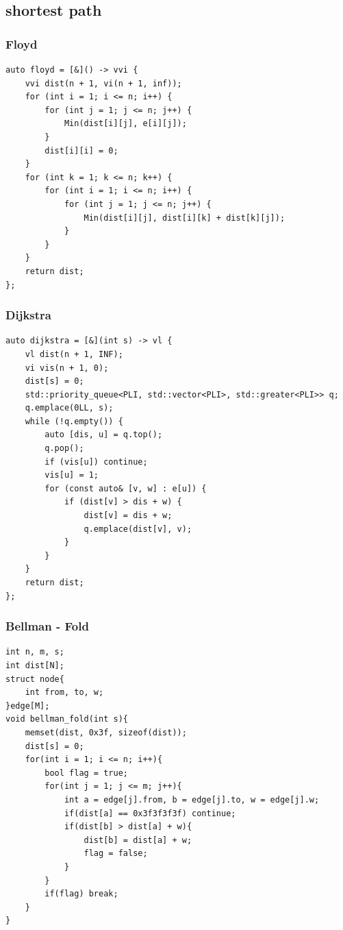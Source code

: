 \documentclass[UTF8, a4paper, titlepage, twoside]{ctexart}
\begin{document}
\subsection{ shortest path }

\subsubsection*{ Floyd }
\begin{lstlisting}[style=cpp]
auto floyd = [&]() -> vvi {
    vvi dist(n + 1, vi(n + 1, inf));
    for (int i = 1; i <= n; i++) {
        for (int j = 1; j <= n; j++) {
            Min(dist[i][j], e[i][j]);
        }
        dist[i][i] = 0;
    }
    for (int k = 1; k <= n; k++) {
        for (int i = 1; i <= n; i++) {
            for (int j = 1; j <= n; j++) {
                Min(dist[i][j], dist[i][k] + dist[k][j]);
            }
        }
    }
    return dist;
};
\end{lstlisting}

\subsubsection*{ Dijkstra }
\begin{lstlisting}[style=cpp]
auto dijkstra = [&](int s) -> vl {
    vl dist(n + 1, INF);
    vi vis(n + 1, 0);
    dist[s] = 0;
    std::priority_queue<PLI, std::vector<PLI>, std::greater<PLI>> q;
    q.emplace(0LL, s);
    while (!q.empty()) {
        auto [dis, u] = q.top();
        q.pop();
        if (vis[u]) continue;
        vis[u] = 1;
        for (const auto& [v, w] : e[u]) {
            if (dist[v] > dis + w) {
                dist[v] = dis + w;
                q.emplace(dist[v], v);
            }
        }
    }
    return dist;
};
\end{lstlisting}

\subsubsection*{ Bellman - Fold }

\begin{lstlisting}[style=cpp]
int n, m, s;
int dist[N];
struct node{
    int from, to, w;
}edge[M];
void bellman_fold(int s){
    memset(dist, 0x3f, sizeof(dist));
    dist[s] = 0;
    for(int i = 1; i <= n; i++){
        bool flag = true;
        for(int j = 1; j <= m; j++){
            int a = edge[j].from, b = edge[j].to, w = edge[j].w;
            if(dist[a] == 0x3f3f3f3f) continue;
            if(dist[b] > dist[a] + w){
                dist[b] = dist[a] + w;
                flag = false;
            }
        }
        if(flag) break;
    }
}
\end{lstlisting}
\end{document}
